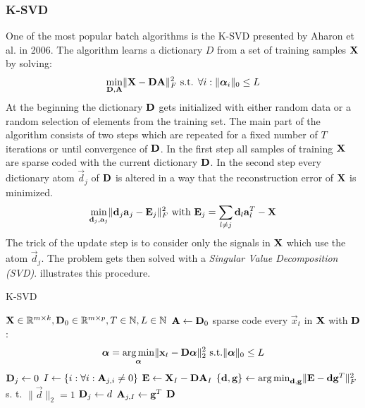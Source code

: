 \subsubsection{K-SVD}
\label{sec:k-svd}
One of the most popular batch algorithms is the K-SVD presented by
Aharon et al. in 2006\cite{Aharon2006}. The algorithm learns a dictionary $D$
from a set of training samples $\boldsymbol{\mathrm{X}}$ by solving:
\begin{equation*}
\min_{\boldsymbol{\mathrm{D}},\boldsymbol{\mathrm{A}}} \lVert \boldsymbol{\mathrm{X}} - \boldsymbol{\mathrm{D}}\boldsymbol{\mathrm{A}} \rVert^{2}_{F} \textrm{
s.t. }
\forall i : \lVert \boldsymbol{\mathrm{\alpha}}_i \rVert_{0} \leq L
\end{equation*}
At the beginning the dictionary $\boldsymbol{\mathrm{D}}$ gets initialized with either random
data or a random selection of elements from the training set. The main part of
the algorithm consists of two steps which are repeated for a fixed number of $T$
iterations or until convergence of $\boldsymbol{\mathrm{D}}$. In the first step all samples of
training $\boldsymbol{\mathrm{X}}$ are sparse coded with the current dictionary $\boldsymbol{\mathrm{D}}$. In
the second step every dictionary atom $\vec{d}_j$ of $\boldsymbol{\mathrm{D}}$ is altered in a
way that the reconstruction error of $\boldsymbol{\mathrm{X}}$ is minimized. 
\begin{equation*}
\min_{\boldsymbol{\mathrm{d}}_j,\boldsymbol{\mathrm{a}}_j} \lVert \boldsymbol{\mathrm{d}}_j\boldsymbol{\mathrm{a}}_j - \boldsymbol{\mathrm{E}}_j \rVert^{2}_{F}
\textrm{ with }
\boldsymbol{\mathrm{E}}_j = \sum_{l\neq j} \boldsymbol{\mathrm{d}}_l\boldsymbol{\mathrm{a}}_l^T - \boldsymbol{\mathrm{X}}
\end{equation*} 
The trick of the update step is to consider only the signals in $\boldsymbol{\mathrm{X}}$ which
use the atom $\vec{d}_j$. The problem gets then solved with a \emph{Singular
Value Decomposition (SVD)}. 
 illustrates this procedure. 

\begin{algorithm}[H]
\caption{K-SVD}
\label{alg:k-svd}
\begin{algorithmic}[1]
\REQUIRE $\boldsymbol{\mathrm{X}} \in \mathbb{R}^{m \times k}, \boldsymbol{\mathrm{D}}_0 \in \mathbb{R}^{m
\times p}, T \in \mathbb{N}, L \in \mathbb{N}$
\STATE $\boldsymbol{\mathrm{A}} \gets \boldsymbol{\mathrm{D}}_0$
\STATE sparse code every $\vec{x}_t$ in $\boldsymbol{\mathrm{X}}$ with $\boldsymbol{\mathrm{D}}$:
\begin{equation}
\boldsymbol{\mathrm{\alpha}} = \operatorname*{arg\,min}_{\boldsymbol{\mathrm{\alpha}}}\lVert
\boldsymbol{\mathrm{x}}_t - \boldsymbol{\mathrm{D}}\boldsymbol{\mathrm{\alpha}}\rVert_2^2 \text{ s.t.}
\lVert\boldsymbol{\mathrm{\alpha}}\rVert_0 \leq L
\end{equation}
\label{alg:k-svd_start}
\STATE $\boldsymbol{\mathrm{D}}_j \gets 0$
\STATE $I \gets \{ i : \forall i : \boldsymbol{\mathrm{A}}_{j,i} \neq 0 \}$
\STATE $\boldsymbol{\mathrm{E}} \gets \boldsymbol{\mathrm{X}}_I - \boldsymbol{\mathrm{D}}\boldsymbol{\mathrm{A}}_I$
\STATE $\{\boldsymbol{\mathrm{d}},\boldsymbol{\mathrm{g}}\} \gets \operatorname*{arg\,min}_{\boldsymbol{\mathrm{d}},\boldsymbol{\mathrm{g}}} \lVert \boldsymbol{\mathrm{E}}-
\boldsymbol{\mathrm{d}}\boldsymbol{\mathrm{g}}^T \rVert_F^{2}$ s. t. $\lVert
\vec{d} \rVert_{2} = 1$
\STATE $\boldsymbol{\mathrm{D}}_j \gets d$
\STATE $\boldsymbol{\mathrm{A}}_{j,I} \gets \boldsymbol{\mathrm{g}}^T$
\ENDFOR\label{alg:k-svd_end}
\ENDFOR
\RETURN $\boldsymbol{\mathrm{D}}$
\end{algorithmic}
\end{algorithm}

